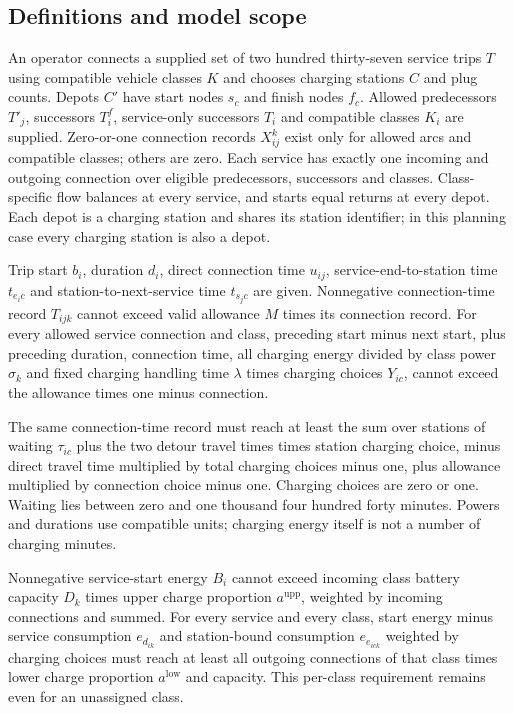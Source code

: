 \documentclass[10pt]{article}
\begin{document}
\subsection*{Definitions and model scope}
An operator connects a supplied set of two hundred thirty-seven service trips $T$ using compatible vehicle classes $K$ and chooses charging stations $C$ and plug counts. Depots $C'$ have start nodes $s_c$ and finish nodes $f_c$. Allowed predecessors $T'_j$, successors $T_i^f$, service-only successors $T_i$ and compatible classes $K_i$ are supplied. Zero-or-one connection records $X_{ij}^k$ exist only for allowed arcs and compatible classes; others are zero. Each service has exactly one incoming and outgoing connection over eligible predecessors, successors and classes. Class-specific flow balances at every service, and starts equal returns at every depot. Each depot is a charging station and shares its station identifier; in this planning case every charging station is also a depot.

Trip start $b_i$, duration $d_i$, direct connection time $u_{ij}$, service-end-to-station time $t_{e_i c}$ and station-to-next-service time $t_{s_j c}$ are given. Nonnegative connection-time record $T_{ijk}$ cannot exceed valid allowance $M$ times its connection record. For every allowed service connection and class, preceding start minus next start, plus preceding duration, connection time, all charging energy divided by class power $\sigma_k$ and fixed charging handling time $\lambda$ times charging choices $Y_{ic}$, cannot exceed the allowance times one minus connection.

The same connection-time record must reach at least the sum over stations of waiting $\tau_{ic}$ plus the two detour travel times times station charging choice, minus direct travel time multiplied by total charging choices minus one, plus allowance multiplied by connection choice minus one. Charging choices are zero or one. Waiting lies between zero and one thousand four hundred forty minutes. Powers and durations use compatible units; charging energy itself is not a number of charging minutes.

Nonnegative service-start energy $B_i$ cannot exceed incoming class battery capacity $D_k$ times upper charge proportion $a^{\mathrm{upp}}$, weighted by incoming connections and summed. For every service and every class, start energy minus service consumption $e_{d_{ik}}$ and station-bound consumption $e_{e_{ic k}}$ weighted by charging choices must reach at least all outgoing connections of that class times lower charge proportion $a^{\mathrm{low}}$ and capacity. This per-class requirement remains even for an unassigned class.
\end{document}
